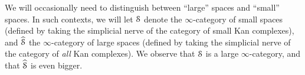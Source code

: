 \begin{Didn't Read}
\begin{remark}
We will occasionally need to distinguish between ``large'' spaces and ``small'' spaces.
In such contexts, we will let $\operatorname{\mathcal{S}}$ denote the $\infty$-category of small spaces (defined
by taking the simplicial nerve of the category of small Kan complexes), and $\widehat{\operatorname{\mathcal{S}}}$ the $\infty$-category of large spaces (defined by taking the simplicial nerve of the
category of {\em all} Kan complexes). We observe that $\operatorname{\mathcal{S}}$ is a large $\infty$-category, and that
$\widehat{\operatorname{\mathcal{S}}}$ is even bigger.
\end{remark}

\end{Didn't Read}